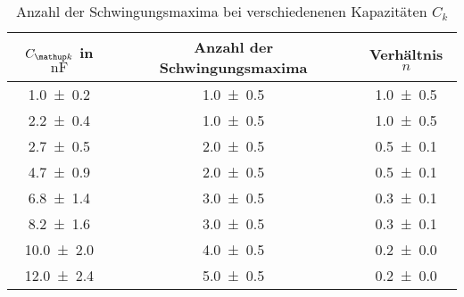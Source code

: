 \begin{table} 
\centering 
\caption{ Anzahl der Schwingungsmaxima bei verschiedenenen Kapazitäten $C_k$} 
\label{fig:teila_n_ck} 
\begin{tabular}{S S S } 
\toprule  
{$C\ua{k}$ in $\si{\nano\farad}$} & {Anzahl der Schwingungsmaxima} & {Verhältnis $n$}  \\ 
\midrule  
\num{1.0\pm0.2} & \num{1.0\pm0.5} & \num{1.0\pm0.5}\\ 
\num{2.2\pm0.4} & \num{1.0\pm0.5} & \num{1.0\pm0.5}\\ 
\num{2.7\pm0.5} & \num{2.0\pm0.5} & \num{0.5\pm0.1}\\ 
\num{4.7\pm0.9} & \num{2.0\pm0.5} & \num{0.5\pm0.1}\\ 
\num{6.8\pm1.4} & \num{3.0\pm0.5} & \num{0.3\pm0.1}\\ 
\num{8.2\pm1.6} & \num{3.0\pm0.5} & \num{0.3\pm0.1}\\ 
\num{10.0\pm2.0} & \num{4.0\pm0.5} & \num{0.2\pm0.0}\\ 
\num{12.0\pm2.4} & \num{5.0\pm0.5} & \num{0.2\pm0.0}\\ 
\bottomrule 
\end{tabular} 
\end{table}

